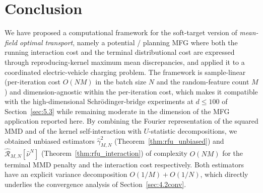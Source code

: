 \documentclass[11pt,leqno]{article}
\theoremstyle{plain}
\theoremstyle{remark}
\theoremstyle{definition}
\numberwithin{equation}{section}
\numberwithin{figure}{section}
\numberwithin{table}{section}
\numberwithin{algorithm}{section}
\begin{document}
\section{Conclusion}\label{sec:7}

We have proposed a computational framework for the soft-target version of
\emph{mean-field optimal transport}, namely a potential / planning MFG
where both the running interaction cost and the terminal distributional cost are expressed
through reproducing-kernel maximum mean discrepancies, and applied it to a coordinated electric-vehicle charging problem.
The framework is sample-linear (per-iteration cost $O(NM)$ in the batch size $N$ and the random-feature count $M$)
and dimension-agnostic within the per-iteration cost,
which makes it compatible with the high-dimensional Schr{\"o}dinger-bridge experiments at $d\le 100$
of Section~\ref{sec:5.3} while remaining moderate in the dimension of the MFG application reported here.
By combining the Fourier representation of the squared MMD and of the kernel self-interaction
with $U$-statistic decompositions,
we obtained unbiased estimators
$\hat\gamma_{M,N}^2$ (Theorem~\ref{thm:rfu_unbiased})
and $\hat{\mathcal{R}}_{M,N}[\hat\nu^N]$ (Theorem~\ref{thm:rfu_interaction})
of complexity $O(NM)$ for the terminal MMD penalty and the interaction cost respectively.
Both estimators have an explicit variance decomposition $O(1/M)+O(1/N)$,
which directly underlies the convergence analysis of Section~\ref{sec:4.2conv}.
\end{document}
